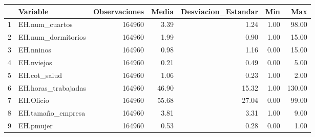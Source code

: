 \begin{table}[ht]
\centering
\begin{tabular}{rlrrrrr}
  \hline
 & Variable & Observaciones & Media & Desviacion\_Estandar & Min & Max \\ 
  \hline
1 & EH.num\_cuartos & 164960 & 3.39 & 1.24 & 1.00 & 98.00 \\ 
  2 & EH.num\_dormitorios & 164960 & 1.99 & 0.90 & 1.00 & 15.00 \\ 
  3 & EH.nninos & 164960 & 0.98 & 1.16 & 0.00 & 15.00 \\ 
  4 & EH.nviejos & 164960 & 0.21 & 0.49 & 0.00 & 5.00 \\ 
  5 & EH.cot\_salud & 164960 & 1.06 & 0.23 & 1.00 & 2.00 \\ 
  6 & EH.horas\_trabajadas & 164960 & 46.90 & 15.32 & 1.00 & 130.00 \\ 
  7 & EH.Oficio & 164960 & 55.68 & 27.04 & 0.00 & 99.00 \\ 
  8 & EH.tamaño\_empresa & 164960 & 3.81 & 3.31 & 1.00 & 9.00 \\ 
  9 & EH.pmujer & 164960 & 0.53 & 0.28 & 0.00 & 1.00 \\ 
   \hline
\end{tabular}
\end{table}
